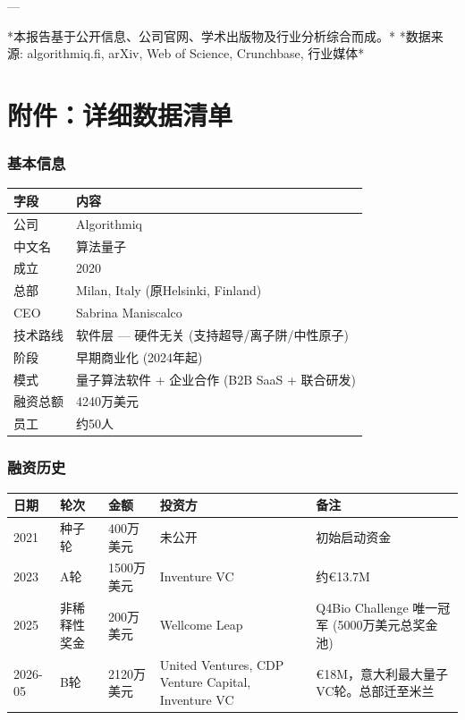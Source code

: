 \documentclass[11pt,a4paper]{ctexart}
\begin{document}
---

*本报告基于公开信息、公司官网、学术出版物及行业分析综合而成。*
*数据来源: algorithmiq.fi, arXiv, Web of Science, Crunchbase, 行业媒体*

\newpage\part{附件：详细数据清单}
\section{基本信息}
{\footnotesize\begin{longtable}{p{3cm}p{11cm}}
\toprule\textbf{字段} & \textbf{内容} \\ \midrule\endfirsthead
公司 & Algorithmiq \\
中文名 & 算法量子 \\
成立 & 2020 \\
总部 & Milan, Italy (原Helsinki, Finland) \\
CEO & Sabrina Maniscalco \\
技术路线 & 软件层 — 硬件无关 (支持超导/离子阱/中性原子) \\
阶段 & 早期商业化 (2024年起) \\
模式 & 量子算法软件 + 企业合作 (B2B SaaS + 联合研发) \\
融资总额 & 4240万美元 \\
员工 & 约50人 \\
\bottomrule\end{longtable}}
\section{融资历史}
{\footnotesize\begin{longtable}{p{1.5cm}p{2cm}p{2cm}p{4cm}p{4.5cm}}
\toprule\textbf{日期} & \textbf{轮次} & \textbf{金额} & \textbf{投资方} & \textbf{备注} \\ \midrule\endfirsthead
2021 & 种子轮 & 400万美元 & 未公开 & 初始启动资金 \\
2023 & A轮 & 1500万美元 & Inventure VC & 约€13.7M \\
2025 & 非稀释性奖金 & 200万美元 & Wellcome Leap & Q4Bio Challenge 唯一冠军 (5000万美元总奖金池) \\
2026-05 & B轮 & 2120万美元 & United Ventures, CDP Venture Capital, Inventure VC & €18M，意大利最大量子VC轮。总部迁至米兰 \\
\bottomrule\end{longtable}}
\end{document}
